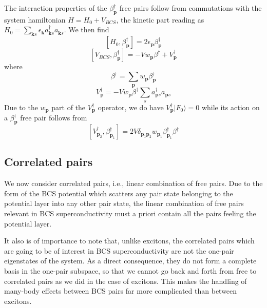 \documentclass[aps,prb,preprint,groupedaddress,amsmath]{revtex4}
\newcommand{\vp}{\ensuremath{\mathbf{p}}}
\newcommand{\vk}{\ensuremath{\mathbf{k}}}
\newcommand{\dg}{\ensuremath{\dagger}}
\begin{document}
The interaction properties of the $\beta_\vp^\dg$ free pairs follow from commutations with the system hamiltonian $H=H_0+V_{BCS}$, the kinetic part reading as $H_0=\sum_{\vk{s}}\epsilon_\vk{}a^\dg_{\vk{s}}a^{}_{\vk{s}}$. We then find
\begin{equation}  \label{eq:betaH}
\left[H_0,\beta^{\dagger}_\vp\right]  =2\epsilon_\vp\beta^{\dagger}_\vp
\end{equation}
\begin{equation}  \label{eq:vbeta}
\left[V_{BCS},\beta^{\dagger}_\vp\right] 
=-Vw^{}_\vp\beta^{\dagger}+V^{\dagger}_\vp
\end{equation}
where 
\begin{equation}
\beta^{\dagger}=\sum_\vp{}w_\vp\beta^{\dagger}_\vp
\end{equation}
\begin{equation}
V^\dg_\vp=-Vw^{}_\vp\beta^{\dagger}\sum_s{}a^\dg_{\vp{s}}a^{}_{\vp{s}}
\end{equation}
Due to the $w_\vp$ part of the $V^\dg_\vp$ operator, we do have $V^\dg_\vp|F_0{\rangle}=0$ while its action on a $\beta_\vp^\dg$ free pair follows from 
\begin{equation}  \label{eq:vpotbeta}
\left[V^{\dagger}_{\mathbf{p} _2},\beta^{\dagger}_{\mathbf{p} _1}\right] 
=2V\delta_{\mathbf{p} _1\mathbf{p} _2}w_{\mathbf{p} _1}\beta^{\dagger}_{\mathbf{p} _1}\beta^{\dagger}_{}
\end{equation}

\subsection{Correlated pairs}


We now consider correlated pairs, i.e., linear combination of free pairs. Due to the form of the BCS potential which scatters any pair state belonging to the potential layer into any other pair state, the linear combination of free pairs relevant in BCS superconductivity must a priori contain all the pairs feeling the potential layer.

 It also is of importance to note that, unlike excitons, the correlated pairs which are going to be of interest in BCS superconductivity are not the one-pair eigenstates of the system. As a direct consequence, they do not form a complete basis in the one-pair subspace, so that we cannot go back and forth from free to correlated pairs as we did in the case of excitons. This makes the handling of many-body effects between BCS pairs far more complicated than between excitons. 
\end{document}
